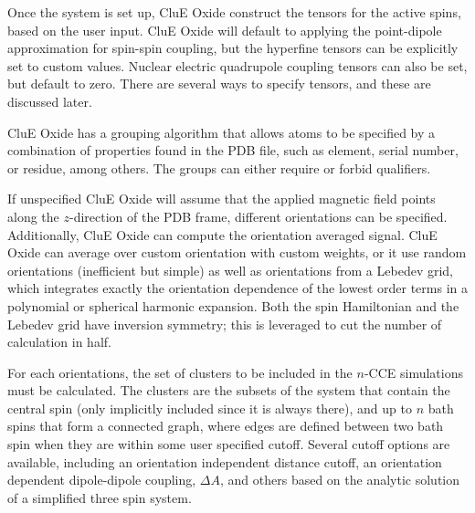 \documentclass{book}
\begin{document}
Once the system is set up, CluE Oxide construct the tensors for the active spins,
based on the user input.  CluE Oxide will default to applying the point-dipole 
approximation for spin-spin coupling, but the hyperfine tensors can be 
explicitly set to custom values.  
Nuclear electric quadrupole coupling tensors can also be set, but default to 
zero.  There are several ways to specify tensors, and these are discussed later.   

CluE Oxide has a grouping algorithm that allows atoms to be specified by a combination 
of properties found in the PDB file, such as element, serial number, or residue,
among others.  The groups can either require or forbid qualifiers.
  
If unspecified CluE Oxide will assume that the applied magnetic field points
along the $z$-direction of the PDB frame, different orientations can be
specified.  Additionally, CluE Oxide can compute the orientation averaged signal.
CluE Oxide can average over custom orientation with custom weights, 
or it use random orientations (inefficient but simple) 
as well as orientations from a Lebedev grid, which integrates exactly 
the orientation dependence of the lowest order terms in a 
polynomial or spherical harmonic expansion\cite{1999_Lebedev}.  
Both the spin Hamiltonian and the Lebedev grid have inversion symmetry; 
this is leveraged to cut the number of calculation in half.

For each orientations, the set of clusters to be included in the $n$-CCE 
simulations must be calculated.  The clusters are the subsets of the system
that contain the central spin (only implicitly included since it is always 
there), and up to $n$ bath spins that form a connected graph, where edges are
defined between two bath spin when they are within some user specified cutoff.
Several cutoff options are available, including 
an orientation independent distance cutoff, 
an orientation dependent dipole-dipole coupling, $\Delta A$, and others
based on the analytic solution of a simplified three spin system.
\end{document}
